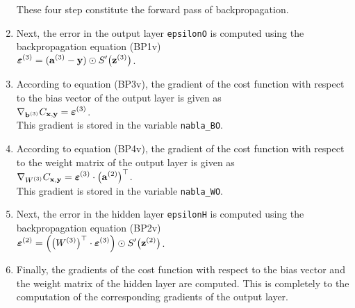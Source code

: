 \begin{enumerate}
      These four step constitute the forward pass of backpropagation.
\item Next, the error in the output layer \texttt{epsilonO} is computed using the backpropagation equation
      (BP1v)
      \\[0.2cm]
      \hspace*{1.3cm}
      $\displaystyle \boldsymbol{\varepsilon}^{(3)} = (\mathbf{a}^{(3)} - \mathbf{y}) \odot S'\bigl(\mathbf{z}^{(3)}\bigr)$.
\item According to  equation (BP3v), the gradient of the cost function with respect to the bias vector of the
      output layer is given as
      \\[0.2cm]
      \hspace*{1.3cm}
      $\displaystyle \nabla_{\mathbf{b}^{(3)}} C_{\mathbf{x}, \mathbf{y}} = \boldsymbol{\varepsilon}^{(3)}$.
      \\[0.2cm]
      This gradient is stored in the variable \texttt{nabla\_BO}.
\item According to equation (BP4v), the gradient  of the cost function with respect to the weight matrix of the
      output layer is given as
      \\[0.2cm]
      \hspace*{1.3cm}
      $\displaystyle \nabla_{W^{(3)}} C_{\mathbf{x}, \mathbf{y}} = \boldsymbol{\varepsilon}^{(3)} \cdot \bigl(\mathbf{a}^{(2)}\bigr)^\top$.
      \\[0.2cm]
      This gradient is stored in the variable \texttt{nabla\_WO}.
\item Next, the error in the hidden layer \texttt{epsilonH} is computed using the backpropagation equation
      (BP2v)
      \\[0.2cm]
      \hspace*{1.3cm}
      $\displaystyle \boldsymbol{\varepsilon}^{(2)} = \Bigl(\bigl(W^{(3)}\bigr)^\top \cdot \boldsymbol{\varepsilon}^{(3)}\Bigr) \odot
           S'\bigl(\mathbf{z}^{(2)}\bigr)
      $.
\item Finally, the gradients of the cost function with respect to the bias
      vector and the weight matrix of the hidden layer are computed.  This is completely to the computation of
      the corresponding gradients of the output layer.
\end{enumerate}

